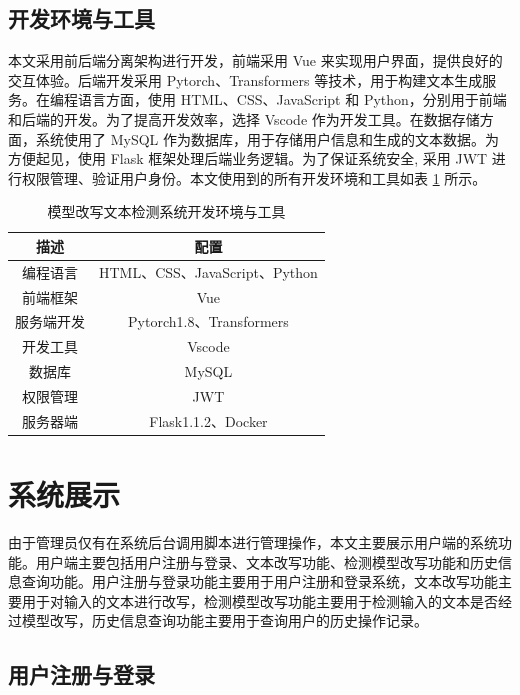\subsection{开发环境与工具}
\label{sec:sys-env}

本文采用前后端分离架构进行开发，前端采用 Vue 来实现用户界面，提供良好的交互体验。后端开发采用 Pytorch、Transformers 等技术，用于构建文本生成服务。在编程语言方面，使用 HTML、CSS、JavaScript 和 Python，分别用于前端和后端的开发。为了提高开发效率，选择 Vscode 作为开发工具。在数据存储方面，系统使用了 MySQL 作为数据库，用于存储用户信息和生成的文本数据。为方便起见，使用 Flask 框架处理后端业务逻辑。为了保证系统安全, 采用 JWT 进行权限管理、验证用户身份。本文使用到的所有开发环境和工具如表 \ref{tab:sys-env} 所示。

\begin{table}[htbp]
    \centering
    \caption{模型改写文本检测系统开发环境与工具}
    \label{tab:sys-env}
    \begin{tabular}{cc}
        \toprule
        \textbf{描述} & \textbf{配置} \\
        \midrule
        编程语言 & HTML、CSS、JavaScript、Python \\
        前端框架 & Vue \\
        服务端开发 & Pytorch1.8、Transformers \\
        开发工具 & Vscode \\
        数据库 & MySQL \\
        权限管理 & JWT \\
        服务器端 & Flask1.1.2、Docker \\
        \bottomrule
    \end{tabular}
\end{table}

\section{系统展示}
\label{sec:sys-show}

由于管理员仅有在系统后台调用脚本进行管理操作，本文主要展示用户端的系统功能。用户端主要包括用户注册与登录、文本改写功能、检测模型改写功能和历史信息查询功能。用户注册与登录功能主要用于用户注册和登录系统，文本改写功能主要用于对输入的文本进行改写，检测模型改写功能主要用于检测输入的文本是否经过模型改写，历史信息查询功能主要用于查询用户的历史操作记录。

\subsection{用户注册与登录}

